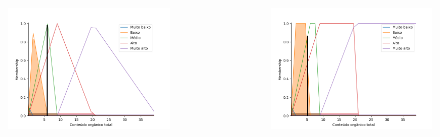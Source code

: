 \documentclass[aspectratio=169]{beamer} %
\begin{document}
{{{{{{{{{{{\begin{frame}
\begin{flushright}
\begin{columns}
        \centering
         \begin{figure}
		\centering
		\includegraphics[scale=0.4]{images/COT_Motubu_triangular.png}
	\end{figure}
	     	
        \centering
         \begin{figure}
		\centering
		\includegraphics[scale=0.4]{images/COT_Motubu_trapezoidal.png}
	\end{figure}
    \end{columns}

\end{flushright}

\end{frame} }






}}}}}}}}}}
\end{document}
